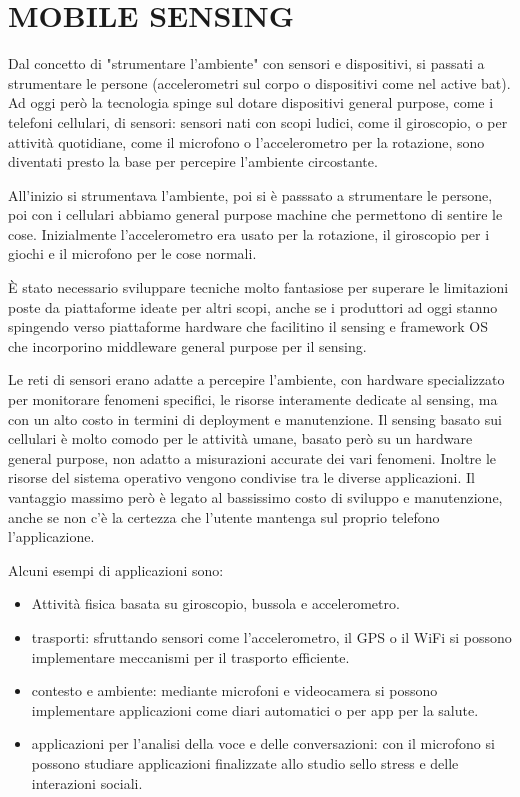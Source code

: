 \section{MOBILE SENSING}
Dal concetto di "strumentare l'ambiente" con sensori e dispositivi, si passati a
strumentare le persone (accelerometri sul corpo o dispositivi come nel active
bat). Ad oggi però la tecnologia spinge sul dotare dispositivi general purpose,
come i telefoni cellulari, di sensori: sensori nati con scopi ludici, come il
giroscopio, o per attività quotidiane, come il microfono o l'accelerometro per
la rotazione, sono diventati presto la base per percepire l'ambiente
circostante.

All'inizio si strumentava l'ambiente, poi si è passsato a strumentare le persone,
poi con i cellulari abbiamo general purpose machine che permettono di sentire le
cose. Inizialmente l'accelerometro era usato per la rotazione, il giroscopio per
i giochi e il microfono per le cose normali.

È stato necessario sviluppare tecniche molto fantasiose per superare le
limitazioni poste da piattaforme ideate per altri scopi, anche se i produttori
ad oggi stanno spingendo verso piattaforme hardware che facilitino il sensing e
framework OS che incorporino middleware general purpose per il sensing.

Le reti di sensori erano adatte a percepire l'ambiente, con hardware
specializzato per monitorare fenomeni specifici, le risorse interamente dedicate
al sensing, ma con un alto costo in termini di deployment e manutenzione.
Il sensing basato sui cellulari è molto comodo per le attività umane, basato
però su un hardware general purpose, non adatto a misurazioni accurate dei vari
fenomeni. Inoltre le risorse del sistema operativo vengono condivise tra le
diverse applicazioni. Il vantaggio massimo però è legato al bassissimo costo di
sviluppo e manutenzione, anche se non c'è la certezza che l'utente mantenga sul
proprio telefono l'applicazione.

Alcuni esempi di applicazioni sono:
\begin{itemize}
\item Attività fisica basata su giroscopio, bussola e accelerometro.
\item trasporti: sfruttando sensori come l'accelerometro, il GPS o il WiFi si
possono implementare meccanismi per il trasporto efficiente.
\item contesto e ambiente: mediante microfoni e videocamera si possono
implementare applicazioni come diari automatici o per app per la salute.
\item applicazioni per l'analisi della voce e delle conversazioni: con il
microfono si possono studiare applicazioni finalizzate allo studio sello stress
e delle interazioni sociali.
\end{itemize}


